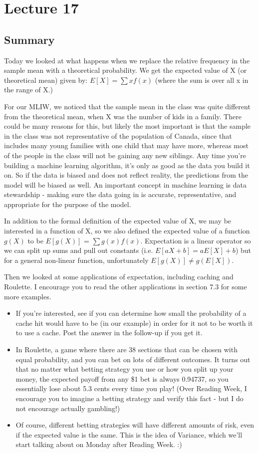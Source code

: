 \section{Lecture 17}
\subsection{Summary}
Today we looked at what happens when we replace the relative frequency in the sample mean with a theoretical probability. We get the expected value of X (or theoretical mean) given by: $E[X] = \sum x f(x)$ (where the sum is over all x in the range of X.) 

For our MLIW, we noticed that the sample mean in the class was quite different from the theoretical mean, when X was the number of kids in a family. There could be many reasons for this, but likely the most important is that the sample in the class was not representative of the population of Canada, since that includes many young families with one child that may have more, whereas most of the people in the class will not be gaining any new siblings. Any time you're building a machine learning algorithm, it's only as good as the data you build it on. So if the data is biased and does not reflect reality, the predictions from the model will be biased as well. An important concept in machine learning is data stewardship - making sure the data going in is accurate, representative, and appropriate for the purpose of the model.

In addition to the formal definition of the expected value of X, we may be interested in a function of X, so we also defined the expected value of a function $g(X)$ to be $E[g(X)]$ = $\sum g(x) f(x)$. Expectation is a linear operator so we can split up sums and pull out constants (i.e. $E[aX+b] = aE[X] + b$) but for a general non-linear function, unfortunately $E[g(X)]\neq g(E[X])$.

Then we looked at some applications of expectation, including caching and Roulette. I encourage you to read the other applications in section 7.3 for some more examples.
\begin{itemize}
    \item If you're interested, see if you can determine how small the probability of a cache hit would have to be (in our example) in order for it not to be worth it to use a cache. Post the answer in the follow-up if you get it.
    \item In Roulette, a game where there are 38 sections that can be chosen with equal probability, and you can bet on lots of different outcomes. It turns out that no matter what betting strategy you use or how you split up your money, the expected payoff from any \$1 bet is always 0.94737, so you essentially lose about 5.3 cents every time you play! (Over Reading Week, I encourage you to imagine a betting strategy and verify this fact - but I do not encourage actually gambling!)
    \item Of course, different betting strategies will have different amounts of risk, even if the expected value is the same. This is the idea of Variance, which we'll start talking about on Monday after Reading Week. :)
\end{itemize}

